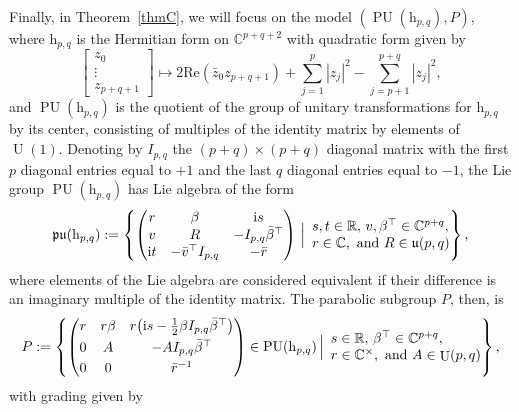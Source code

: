 \documentclass[pdftex]{sigma}
\numberwithin{equation}{section}
\theoremstyle{definition}
\DeclareMathOperator{\Utry}{\mathrm{U}}
\DeclareMathOperator{\PU}{\mathrm{PU}}
\begin{document}
Finally, in Theorem~\ref{thmC}, we will focus on the model $(\PU(\mathrm{h}_{p,q}),P)$, where $\mathrm{h}_{p,q}$ is the Hermitian form on $\mathbb{C}^{p+q+2}$ with quadratic form given by \[\begin{bmatrix}z_0 \\ \vdots \\ z_{p+q+1}\end{bmatrix}\mapsto 2\mathrm{Re}(\bar{z}_0z_{p+q+1})+\sum_{j=1}^p |z_j|^2-\sum_{j=p+1}^{p+q}|z_j|^2,\] and $\PU(\mathrm{h}_{p,q})$ is the quotient of the group of unitary transformations for $\mathrm{h}_{p,q}$ by its center, consisting of multiples of the identity matrix by elements of $\Utry(1)$. Denoting by $I_{p,q}$ the ${(p+q)}\times(p+q)$ diagonal matrix with the first $p$ diagonal entries equal to $+1$ and the last $q$ diagonal entries equal to $-1$, the Lie group $\PU(\mathrm{h}_{p,q})$ has Lie algebra of the form
\[\mathfrak{pu}(\mathrm{h}_{p,q}):=\left\{\begin{pmatrix}r & \beta & \mathrm{i}s \\ v & R & -I_{p,q}\bar{\beta}^\top \\ \mathrm{i}t & -\bar{v}^\top I_{p,q} & -\bar{r}\end{pmatrix}\,\Big| \begin{array}{l@{}} s,t\in\mathbb{R},\, v,\beta^\top\in\mathbb{C}^{p+q}, \\ r\in\mathbb{C},\text{ and } R\in\mathfrak{u}(p,q)\end{array}\right\},\]
where elements of the Lie algebra are considered equivalent if their difference is an imaginary multiple of the identity matrix. The parabolic subgroup $P$, then, is
\[P:=\left\{\begin{pmatrix}r & r\beta & r\bigl(\mathrm{i}s-\tfrac{1}{2}\beta I_{p,q}\bar{\beta}^\top\bigr) \vspace{1mm}\\ 0 & A & -AI_{p,q}\bar{\beta}^\top \vspace{1mm}\\ 0 & 0 & \bar{r}^{-1}\end{pmatrix}\in\PU(\mathrm{h}_{p,q})\,\Big| \begin{array}{l@{}} s\in\mathbb{R},\, \beta^\top\in\mathbb{C}^{p+q}, \\ r\in\mathbb{C}^\times,\text{ and }A\in\Utry(p,q)\end{array}\right\},\]
with grading given by
\end{document}
